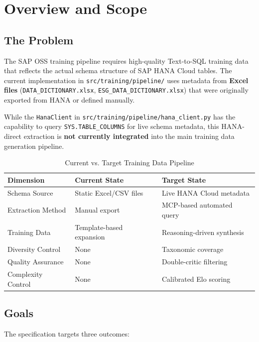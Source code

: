 \chapter{Overview and Scope}
\label{chap:overview}

\section{The Problem}

The SAP OSS training pipeline requires high-quality Text-to-SQL training data that reflects
the actual schema structure of SAP HANA Cloud tables. The current implementation in
\texttt{src/training/pipeline/} uses metadata from \textbf{Excel files}
(\texttt{DATA\_DICTIONARY.xlsx}, \texttt{ESG\_DATA\_DICTIONARY.xlsx}) that were originally
exported from HANA or defined manually.

While the \texttt{HanaClient} in \texttt{src/training/pipeline/hana\_client.py} has the
capability to query \texttt{SYS.TABLE\_COLUMNS} for live schema metadata, this HANA-direct
extraction is \textbf{not currently integrated} into the main training data generation
pipeline.

\begin{table}[H]
\centering
\caption{Current vs. Target Training Data Pipeline}
\label{tab:gap-analysis}
\begin{tabularx}{\textwidth}{lXX}
\toprule
\textbf{Dimension} & \textbf{Current State} & \textbf{Target State} \\
\midrule
Schema Source & Static Excel/CSV files & Live HANA Cloud metadata \\
Extraction Method & Manual export & MCP-based automated query \\
Training Data & Template-based expansion & Reasoning-driven synthesis \\
Diversity Control & None & Taxonomic coverage \\
Quality Assurance & None & Double-critic filtering \\
Complexity Control & None & Calibrated Elo scoring \\
\bottomrule
\end{tabularx}
\end{table}

\section{Goals}

The specification targets three outcomes:

